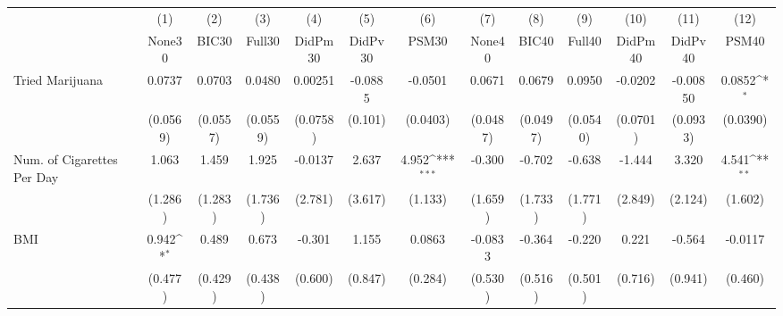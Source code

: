 {
\def\sym#1{\ifmmode^{#1}\else\(^{#1}\)\fi}
\begin{tabular}{l*{12}{c}}
\toprule
            &\multicolumn{1}{c}{(1)}&\multicolumn{1}{c}{(2)}&\multicolumn{1}{c}{(3)}&\multicolumn{1}{c}{(4)}&\multicolumn{1}{c}{(5)}&\multicolumn{1}{c}{(6)}&\multicolumn{1}{c}{(7)}&\multicolumn{1}{c}{(8)}&\multicolumn{1}{c}{(9)}&\multicolumn{1}{c}{(10)}&\multicolumn{1}{c}{(11)}&\multicolumn{1}{c}{(12)}\\
            &\multicolumn{1}{c}{None30}&\multicolumn{1}{c}{BIC30}&\multicolumn{1}{c}{Full30}&\multicolumn{1}{c}{DidPm30}&\multicolumn{1}{c}{DidPv30}&\multicolumn{1}{c}{PSM30}&\multicolumn{1}{c}{None40}&\multicolumn{1}{c}{BIC40}&\multicolumn{1}{c}{Full40}&\multicolumn{1}{c}{DidPm40}&\multicolumn{1}{c}{DidPv40}&\multicolumn{1}{c}{PSM40}\\
\midrule
Tried Marijuana&      0.0737         &      0.0703         &      0.0480         &     0.00251         &     -0.0885         &     -0.0501         &      0.0671         &      0.0679         &      0.0950         &     -0.0202         &    -0.00850         &      0.0852\sym{*}  \\
            &    (0.0569)         &    (0.0557)         &    (0.0559)         &    (0.0758)         &     (0.101)         &    (0.0403)         &    (0.0487)         &    (0.0497)         &    (0.0540)         &    (0.0701)         &    (0.0933)         &    (0.0390)         \\
\addlinespace
Num. of Cigarettes Per Day&       1.063         &       1.459         &       1.925         &     -0.0137         &       2.637         &       4.952\sym{***}&      -0.300         &      -0.702         &      -0.638         &      -1.444         &       3.320         &       4.541\sym{**} \\
            &     (1.286)         &     (1.283)         &     (1.736)         &     (2.781)         &     (3.617)         &     (1.133)         &     (1.659)         &     (1.733)         &     (1.771)         &     (2.849)         &     (2.124)         &     (1.602)         \\
\addlinespace
BMI         &       0.942\sym{*}  &       0.489         &       0.673         &      -0.301         &       1.155         &      0.0863         &     -0.0833         &      -0.364         &      -0.220         &       0.221         &      -0.564         &     -0.0117         \\
            &     (0.477)         &     (0.429)         &     (0.438)         &     (0.600)         &     (0.847)         &     (0.284)         &     (0.530)         &     (0.516)         &     (0.501)         &     (0.716)         &     (0.941)         &     (0.460)         \\

\end{tabular}}
